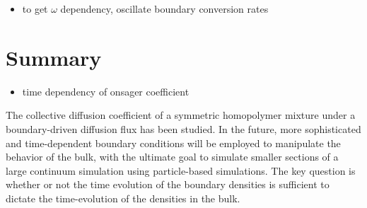 \documentclass[bachelor,       %
               twoside,        %
               BCOR10mm,       %
                ngerman,english  %
               ]{GAUBM}
\begin{document}
\begin{itemize}
  \item to get $\omega$ dependency, oscillate boundary conversion rates
\end{itemize}

\chapter{Summary}

\begin{itemize}
  \item time dependency of onsager coefficient
\end{itemize}

The collective diffusion coefficient of a symmetric homopolymer mixture under a boundary-driven diffusion flux has been studied. In the future, more sophisticated and time-dependent boundary conditions will be employed to manipulate the behavior of the bulk, with the ultimate goal to simulate smaller sections of a large continuum simulation using particle-based simulations. The key question is whether or not the time evolution of the boundary densities is sufficient to dictate the time-evolution of the densities in the bulk.




 


\end{document}
